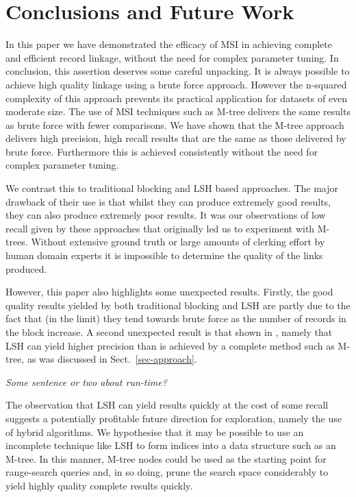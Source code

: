 \documentclass{llncs}
\begin{document}

\section{Conclusions and Future Work\label{sec-concl}}

In this paper we have demonstrated the efficacy of MSI in achieving  complete and efficient record linkage, without the need for complex parameter tuning. In conclusion, this assertion deserves some careful unpacking. It is always possible to achieve high quality linkage using a brute force approach. However the n-squared complexity of this approach prevents its practical application for datasets of even moderate size. The use of MSI techniques such as M-tree delivers the same results as brute force with fewer comparisons. We have shown that the M-tree approach delivers high precision, high recall results that are the same as those delivered by brute force. Furthermore this is achieved consistently without the need for complex parameter tuning.

We contrast this to traditional blocking and LSH based approaches. The major drawback of their use is that whilst they can produce extremely good results, they can also produce extremely poor results. It was our observations of low recall given by these approaches that originally led us to experiment with M-trees. Without extensive ground truth or large amounts of clerking effort by human domain experts it is impossible to determine the quality of the links produced. 

However, this paper also highlights some unexpected results. Firstly, the good quality results yielded by both traditional blocking and LSH are partly due to the fact that (in the limit) they tend towards brute force as the number of records in the block increase. A second unexpected result is that shown in , namely that LSH can yield higher precision than is achieved by a complete method such as M-tree, as was discussed in Sect.~\ref{sec-approach}.


\emph{Some sentence or two about run-time?}

The observation that LSH can yield results quickly at the cost of some recall suggests a potentially profitable future direction for exploration, namely the use of hybrid algorithms. We hypothesise that it may be possible to use an incomplete technique like LSH to form indices into a data structure such as an M-tree. In this manner, M-tree nodes could be used as the starting point for range-search queries and, in so doing, prune the search space considerably to yield highly quality complete results quickly.




 

\end{document}
